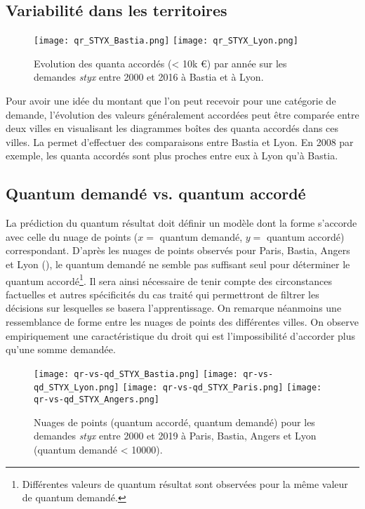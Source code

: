 \subsection{Variabilité dans les territoires}

\begin{figure}[!htb]
	\centering 
	\texttt{[image: qr\_STYX\_Bastia.png]}
	\texttt{[image: qr\_STYX\_Lyon.png]}
	\caption{Evolution des quanta accordés (< 10k \euro) par année sur les demandes \textit{styx} entre 2000 et 2016 à Bastia et à Lyon.}\label{fig:demo:evolution-qr-styx-compare-ville}
\end{figure}

Pour avoir une idée du montant que l'on peut recevoir pour une catégorie de demande, l'évolution des valeurs généralement accordées peut être comparée entre deux villes en visualisant les diagrammes boîtes
des quanta accordés dans ces villes. La   permet d'effectuer des comparaisons entre Bastia et Lyon. En 2008 par exemple, les quanta accordés sont plus proches entre eux à Lyon qu'à Bastia.


\subsection{Quantum demandé vs. quantum accordé}
La prédiction du quantum résultat doit définir un modèle dont la forme s'accorde avec celle du nuage de points ($x=$ quantum demandé, $y=$ quantum accordé) correspondant. D'après les nuages de points observés pour Paris, Bastia, Angers et Lyon (), le quantum demandé ne semble pas suffisant seul pour déterminer le quantum accordé\footnote{Différentes valeurs de quantum résultat sont observées pour la même valeur de quantum demandé.}. Il sera ainsi nécessaire de tenir compte des circonstances factuelles et autres spécificités du cas traité qui permettront de filtrer les décisions sur lesquelles se basera l'apprentissage. On remarque néanmoins une ressemblance de forme entre les nuages de points des différentes villes. On observe empiriquement une caractéristique du droit qui est \og l'impossibilité d'accorder plus qu'une somme demandée\fg{}.

\begin{figure}[!htb]
	\centering 
	\texttt{[image: qr-vs-qd\_STYX\_Bastia.png]}
	\texttt{[image: qr-vs-qd\_STYX\_Lyon.png]}
	\texttt{[image: qr-vs-qd\_STYX\_Paris.png]}
	\texttt{[image: qr-vs-qd\_STYX\_Angers.png]}
	\caption{Nuages de points (quantum accordé, quantum demandé) pour les demandes \textit{styx} entre 2000 et 2019 à Paris, Bastia, Angers et Lyon (quantum demandé < 10000).}\label{fig:demo:qr-vs-qd-styx-compare-ville}
\end{figure}

